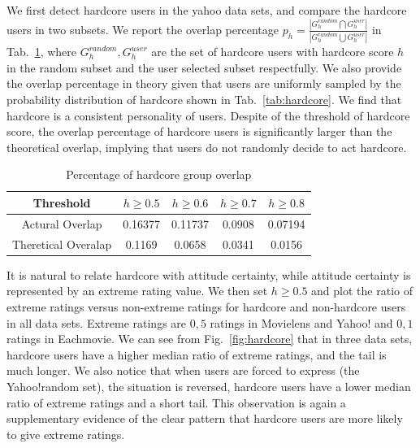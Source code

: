 \documentclass{sig-alternate}
\begin{document}
We first detect hardcore users in the yahoo data sets, and compare the hardcore users in two subsets. We report the overlap percentage $p_h=\frac{|G_{h}^{random}\bigcap G_{h}^{user}|}{|G_{h}^{random}\bigcup G_{h}^{user}|}$ in Tab.~\ref{tab:overlap}, where $G_{h}^{random},G_{h}^{user}$ are the set of hardcore users with hardcore score $h$ in the random subset and the user selected subset respectfully. We also provide the overlap percentage in theory given that users are uniformly sampled by the probability distribution of hardcore shown in Tab.~\ref{tab:hardcore}. We find that hardcore is a consistent personality of users. Despite of the threshold of hardcore score, the overlap percentage of hardcore users is significantly larger than the theoretical overlap, implying that users do not randomly decide to act hardcore.

\begin{table}[htbp]
\centering
\caption{Percentage of hardcore group overlap}\label{tab:overlap}
\centering
\begin{tabular}{|c|c|c|c|c|}
\hline
 Threshold & $h\geq 0.5$ & $h\geq 0.6$ & $h \geq 0.7$ & $h\geq 0.8$ \\\hline\hline
Actural Overlap& 0.16377 &	0.11737 &	0.0908 & 0.07194 \\\hline
Theretical Overalap & 0.1169 &  0.0658 &  0.0341 & 0.0156\\
\hline
\end{tabular}
\end{table}

It is natural to relate hardcore with attitude certainty, while attitude certainty is represented by an extreme rating value. We then set $h\geq 0.5$ and plot the ratio of extreme ratings versus non-extreme ratings for hardcore and non-hardcore users in all data sets. Extreme ratings are $0,5$ ratings in Movielens and Yahoo! and $0,1$ ratings in Eachmovie. We can see from Fig.~\ref{fig:hardcore} that in three data sets, hardcore users have a higher median ratio of extreme ratings, and the tail is much longer. We also notice that when users are forced to express (the Yahoo!random set), the situation is reversed, hardcore users have a lower median ratio of extreme ratings and a short tail.  This observation is again a supplementary evidence of the clear pattern that hardcore users are more likely to give extreme ratings.
\end{document}
